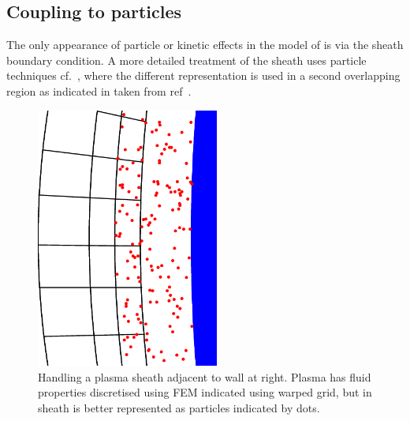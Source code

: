 \subsection{Coupling to particles}\label{sec:coupart2D}
The only appearance of particle or kinetic effects in the model of 
is via the sheath
boundary condition. A more detailed treatment of the sheath uses particle
techniques cf.\ , where the different representation is used in
a second overlapping region as indicated in  taken from
ref~\cite{y1re231}.
\begin{figure}
\centerline{\includegraphics[width=6cm]{../png/pclovm}}
\caption{Handling a plasma sheath adjacent to wall at right.
Plasma has fluid properties discretised using FEM indicated using warped grid,
but in sheath is better represented as particles indicated by dots.\label{fig:pcleadj}} 
\end{figure}


